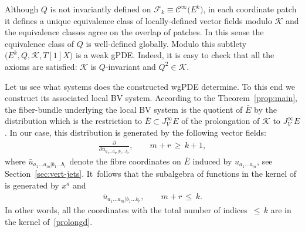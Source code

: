 \documentclass[pdftex]{sigma}
\numberwithin{equation}{section}
\theoremstyle{definition}
\newcommand{\changed}[1]{{#1}}
\renewcommand{\tilde}{\widetilde}
\newcommand{\cF}{\mathcal{F}}
\renewcommand{\geq}{\,{\geqslant}\,}
\renewcommand{\leq}{\,{\leqslant}\,}
\newcommand{\cC}{\mathcal{C}}
\def\cK{\mathcal{K}}
\newcommand{\vprol}{\tilde}
\begin{document}
Although $Q$ is not invariantly defined on $\cF_k\equiv \cC^\infty\bigl(E^k\bigr)$, in each coordinate patch it defines
a unique equivalence class of locally-defined vector fields modulo $\cK$ and the equivalence classes agree on the overlap of patches. In this sense the equivalence class of $Q$ is well-defined globally. Modulo this subtlety $\bigl(E^k,Q,\cK,T[1]X\bigr)$ is a weak gPDE. Indeed, it is easy to check that all the axioms are satisfied: $\cK$ is $Q$-invariant and $Q^2\in \cK$.

Let us see what systems does the constructed wgPDE determine. To this end we construct its associated local BV system. According to the Theorem~\ref{prop:main}, the fiber-bundle underlying the local BV system is the quotient of $\bar E$ by the distribution \smash{$\vprol{\cK}_0$} which is the restriction to $\bar E \subset J^{\infty}_VE$ of the prolongation of $\mathcal{K}$ to $J^{\infty}_VE$. In our case, this distribution is generated by the following vector fields:
\begin{equation}\label{prolongd}
 \begin{gathered}
\frac{\partial}{\partial\bar u_{a_1\dots a_{m}|b_1\dots b_{r}}} ,\qquad m+r\geq k+1,
 \end{gathered}
\end{equation}
\changed{where $\bar{u}_{a_1\dots a_m|b_1\dots b_r}$ denote the fibre coordinates on $\bar{E}$ induced by $u_{a_1\dots a_m}$, see Section~\ref{sec:vert-jets}.} It~follows that the subalgebra of functions in the kernel of \smash{$\vprol{\cK}_0$} is generated by $x^a$ and{\samepage
\begin{gather*}
 \bar{u}_{a_1\dots a_m|b_1\dots b_r},
 \qquad m+r\leq k.%
 \end{gather*}
In other words, all the coordinates with the total number of indices $\leq k$ are in the kernel of~\eqref{prolongd}.}
\end{document}
